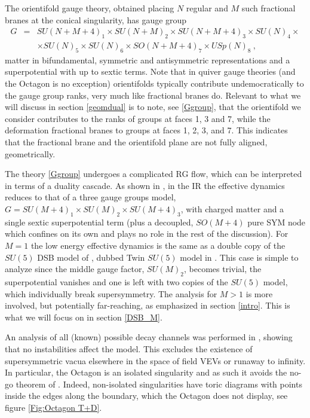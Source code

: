 \documentclass[a4paper,12pt]{article}
\def\beqa{\begin{eqnarray}}
\def\eeqa{\end{eqnarray}}
\begin{document}
The orientifold gauge theory, obtained placing $N$ regular and $M$ such fractional branes at the conical singularity, has gauge group
\beqa
G &=& SU(N+M+4)_1 \times SU(N+M)_2 \times SU(N+M+4)_3 \times SU(N)_4 \times \nonumber \\ 
&& \times SU(N)_5 \times SU(N)_6 \times SO(N+M+4)_7 \times USp(N)_8 ~,
\label{Ggroup}
\eeqa
matter in bifundamental, symmetric and antisymmetric representations and a superpotential with up to sextic terms. Note that in quiver gauge theories (and the Octagon is no exception) orientifolds typically contribute undemocratically to the gauge group ranks, very much like fractional branes do. Relevant to what we will discuss in section \ref{geomdual} is to note, see \eqref{Ggroup}, that the orientifold we consider contributes to the ranks of groups at faces 1, 3 and 7, while the deformation fractional branes to groups at faces 1, 2, 3, and 7. This indicates that the fractional brane and the orientifold plane are not fully aligned, geometrically.  

The theory \eqref{Ggroup} undergoes a complicated RG flow, which can be interpreted in terms of a duality cascade. As shown in \cite{Argurio:2020dkg,Argurio:2020npm}, in the IR the effective dynamics reduces to that of a three gauge groups model, $G= SU(M+4)_1 \times SU(M)_2 \times SU(M+4)_3$, with charged matter and a single sextic superpotential term (plus a decoupled, $SO(M+4)$ pure SYM node which confines on its own and plays no role in the rest of the discussion). For $M=1$ the low energy effective dynamics is the same as a double copy of the $SU(5)$ DSB model of \cite{Affleck:1983vc}, dubbed Twin $SU(5)$ model in \cite{Argurio:2020dkg}. This case is simple to analyze since the middle gauge factor, $SU(M)_2$, becomes trivial, the superpotential vanishes and one is left with two copies of the $SU(5)$ model, which individually break supersymmetry. The analysis for $M>1$ is more involved, but potentially far-reaching, as emphasized in section \ref{intro}. This is what we will focus on in section \ref{DSB_M}. 

An analysis of all (known) possible decay channels was performed in \cite{Argurio:2020dkg}, showing that no instabilities affect the model. This excludes the existence of supersymmetric vacua elsewhere in the space of field VEVs or runaway to infinity. In particular, the Octagon is an isolated singularity and as such it avoids the no-go theorem of \cite{Argurio:2019eqb}. Indeed, non-isolated singularities have toric diagrams with points inside the edges along the boundary, which the Octagon does not display, see figure \ref{Fig:Octagon T+D}. 
\end{document}
